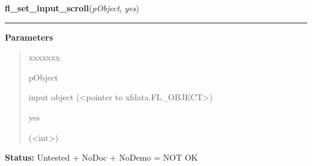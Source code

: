 \hspace{.8\funcindent}\begin{boxedminipage}{\funcwidth}

    \raggedright \textbf{fl\_set\_input\_scroll}(\textit{pObject}, \textit{yes})

    \vspace{-1.5ex}

    \rule{\textwidth}{0.5\fboxrule}
\setlength{\parskip}{2ex}
\setlength{\parskip}{1ex}
      \textbf{Parameters}
      \vspace{-1ex}

      \begin{quote}
        \begin{Ventry}{xxxxxxx}

          \item[pObject]

          input object ({\textless}pointer to 
          xfdata.FL\_OBJECT{\textgreater})

          \item[yes]

          ({\textless}int{\textgreater})

        \end{Ventry}

      \end{quote}

\textbf{Status:} Untested + NoDoc + NoDemo = NOT OK



    \end{boxedminipage}

    \label{xformslib:library:fl_set_input_cursorpos}

    \vspace{0.5ex}

